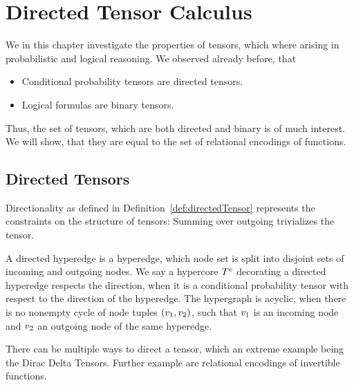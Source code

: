 \section{Directed Tensor Calculus}\label{cha:directedTC}



We in this chapter investigate the properties of tensors, which where arising in probabilistic and logical reasoning.
We observed already before, that
\begin{itemize}
	\item Conditional probability tensors are directed tensors.
	\item Logical formulas are binary tensors.
\end{itemize}

Thus, the set of tensors, which are both directed and binary is of much interest. 
We will show, that they are equal to the set of relational encodings of functions.




\subsection{Directed Tensors}

Directionality as defined in Definition~\ref{def:directedTensor} represents the constraints on the structure of tensors:
Summing over outgoing trivializes the tensor.


\begin{definition}
	A directed hyperedge is a hyperedge, which node set is split into disjoint sets of incoming and outgoing nodes.
	We say a hypercore $T^{e}$ decorating a directed hyperedge respects the direction, when it is a conditional probability tensor with respect to the direction of the hyperedge. 
	The hypergraph is acyclic, when there is no nonempty cycle of node tuples $(v_1,v_2)$, such that $v_1$ is an incoming node and $v_2$ an outgoing node of the same hyperedge.
\end{definition}



There can be multiple ways to direct a tensor, which an extreme example being the Dirac Delta Tensors.
Further example are relational encodings of invertible functions.

